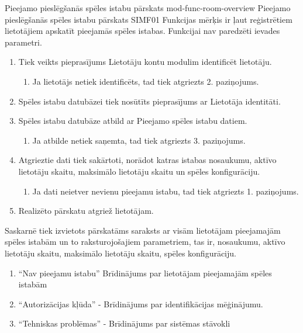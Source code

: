 \moduleFunctionTable
{Pieejamo pieslēgšanās spēles istabu pārskats}
{mod-func-room-overview}
{Pieejamo pieslēgšanās spēles istabu pārskats}
{SIMF01}
{
	Funkcijas mērķis ir ļaut reģistrētiem lietotājiem apskatīt pieejamās spēles istabas.
}
{
	Funkcijai nav paredzēti ievades parametri.
}
{
	\begin{enumerate}
		\item Tiek veikts pieprasījums Lietotāju kontu modulim identificēt lietotāju.
		      \begin{enumerate}
			      \item Ja lietotājs netiek identificēts, tad tiek atgriezts 2. paziņojums.
		      \end{enumerate}
		\item Spēles istabu datubāzei tiek nosūtīts pieprasījums ar Lietotāja identitāti.
		\item Spēles istabu datubāze atbild ar Pieejamo spēles istabu datiem.
		      \begin{enumerate}
			      \item Ja atbilde netiek saņemta, tad tiek atgriezts 3. paziņojums.
		      \end{enumerate}
		\item Atgrieztie dati tiek sakārtoti, norādot katras istabas nosaukumu, aktīvo lietotāju skaitu, maksimālo lietotāju skaitu un spēles konfigurāciju.
		      \begin{enumerate}
			      \item Ja dati neietver nevienu pieejamu istabu, tad tiek atgriezts 1. paziņojums.
		      \end{enumerate}
		\item Realizēto pārskatu atgriež lietotājam.
	\end{enumerate}
}
{
	Saskarnē tiek izvietots pārskatāms saraksts ar visām lietotājam pieejamajām spēles istabām un to raksturojošajiem parametriem,
	tas ir, nosaukumu, aktīvo lietotāju skaitu, maksimālo lietotāju skaitu, spēles konfigurāciju.
}
{
	\begin{enumerate}
		\item ``Nav pieejamu istabu'' Brīdinājums par lietotājam pieejamajām spēles istabām
		\item ``Autorizācijas kļūda'' - Brīdinājums par identifikācijas mēģinājumu.
		\item ``Tehniskas problēmas'' - Brīdinājums par sistēmas stāvokli
	\end{enumerate}
}
